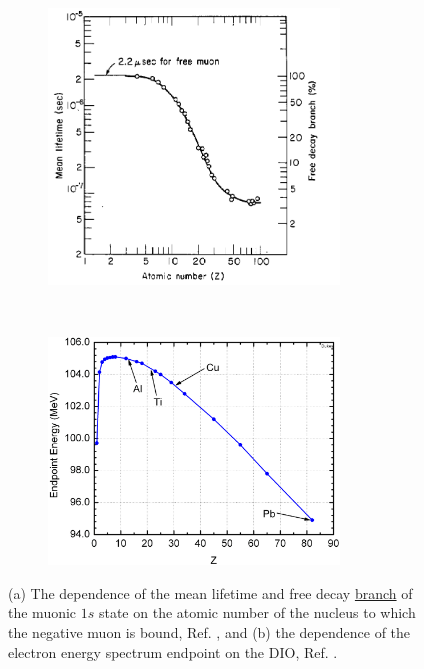 \begin{figure}[!h]
    \centering
    \begin{subfigure}[t]{0.5\textwidth}
        \centering
        \includegraphics[width=0.85\textwidth]{figures/png/lifetime_mu_matter.png}
        \caption{}
        \label{fig:muonicatom}
    \end{subfigure}%
    ~ 
    \begin{subfigure}[t]{0.5\textwidth}
        \centering
        \includegraphics[width=0.85\textwidth]{figures/png/endopint.png}
        \caption{}
        \label{fig:endpoint}
    \end{subfigure}
   \caption[The muonic atom mean lifetime and free decay branch. The dependence 
   of the electron energy spectrum endpoint
   on the DIO.]{(a) The dependence of the mean lifetime and free decay \underline{\red branch}
   of the muonic $1s$ state on the atomic number of the nucleus to which 
   the negative muon is bound, Ref. \cite{TYamazaki_1975}, and (b) 
   the dependence of the electron 
   energy spectrum endpoint on the DIO, Ref. \cite{dukes}.}
    \label{fig:2imins}
  \end{figure}
